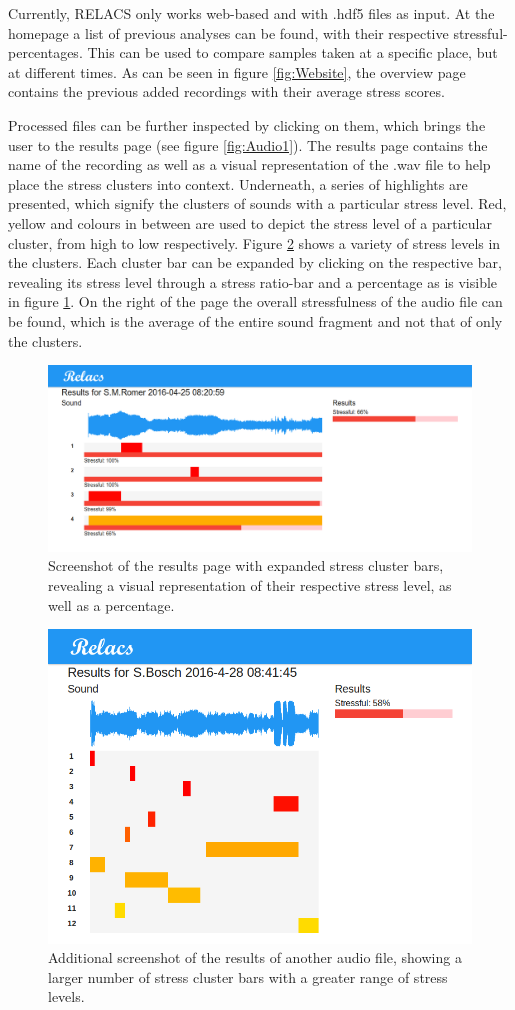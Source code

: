 \documentclass[a4paper]{article}
\begin{document}
Currently, RELACS only works web-based and with .hdf5 files as input. At the homepage a list of previous analyses can be found, with their respective stressful-percentages. This can be used to compare samples taken at a specific place, but at different times. As can be seen in figure \ref{fig:Website}, the overview page contains the previous added recordings with their average stress scores.

Processed files can be further inspected by clicking on them, which brings the user to the results page (see figure \ref{fig:Audio1}). The results page contains the name of the recording as well as a visual representation of the .wav file to help place the stress clusters into context. Underneath, a series of highlights are presented, which signify the clusters of sounds with a particular stress level. Red, yellow and colours in between are used to depict the stress level of a particular cluster, from high to low respectively. Figure \ref{fig:Audio2} shows a variety of stress levels in the clusters. Each cluster bar can be expanded by clicking on the respective bar, revealing its stress level through a stress ratio-bar and a percentage as is visible in figure \ref{fig:Audio1Expand}. On the right of the page the overall stressfulness of the audio file can be found, which is the average of the entire sound fragment and not that of only the clusters.

\begin{figure}[h]
\centering
\includegraphics[width=0.9\linewidth]{./Audio1ResultsExpand}
\caption{Screenshot of the results page with expanded stress cluster bars, revealing a visual representation of their respective stress level, as well as a percentage.}
\label{fig:Audio1Expand}
\end{figure}

\begin{figure}[h]
\centering
\includegraphics[width=0.6\linewidth]{./Audio2Results}
\caption{Additional screenshot of the results of another audio file, showing a larger number of stress cluster bars with a greater range of stress levels.}
\label{fig:Audio2}
\end{figure}
\end{document}
